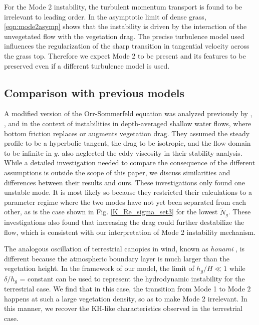 \documentclass{jfm}
\newcommand{\hg}{h_g}
\newcommand{\Ndg}{\tilde{N}_g}
\begin{document}
For the Mode 2 instability, the turbulent momentum transport is found to be irrelevant to leading order.
In the asymptotic limit of dense grass, \eqref{eqn:mode2asymp} shows that the instability is driven by the interaction of the unvegetated flow with the vegetation drag.
The precise turbulence model used influences the regularization of the sharp transition in tangential velocity across the grass top.
Therefore we expect Mode 2 to be present and its features to be preserved even if a different turbulence model is used.

\subsection{Comparison with previous models}

A modified version of the Orr-Sommerfeld equation was analyzed previously by \cite{Chu91}, \cite{Chen97}, and \cite{White07} in the context of instabilities in depth-averaged shallow water flows, where bottom friction replaces or augments vegetation drag.
They assumed the steady profile to be a hyperbolic tangent, the drag to be isotropic, and the flow domain to be infinite in $y$.
\cite{White07} also neglected the eddy viscosity in their stability analysis.
While a detailed investigation needed to compare the consequence of the different assumptions is outside the scope of this paper, we discuss similarities and differences between their results and ours.
These investigations only found one unstable mode.
It is most likely so because they restricted their calculations to a parameter regime where the two modes have not yet been separated from each other, as is the case shown in Fig. \ref{K_Re_sigma_set3} for the lowest $\Ndg$.
These investigations also found that increasing the drag could further destabilize the flow, which is consistent with our interpretation of Mode 2 instability mechanism.

The analogous oscillation of terrestrial canopies in wind, known as \textit{honami} \citep{Inoue56,Raupach96}, is different because the atmospheric boundary layer is much larger than the vegetation height.
In the framework of our model, the limit of $\hg/H \ll 1$ while $\delta/\hg$ = constant can be used to represent the hydrodynamic instability for the terrestrial case.
We find that in this case, the transition from Mode 1 to Mode 2 happens at such a large vegetation density, so as to make Mode 2 irrelevant. 
In this manner, we recover the KH-like characteristics observed in the terrestrial case. 
\end{document}
